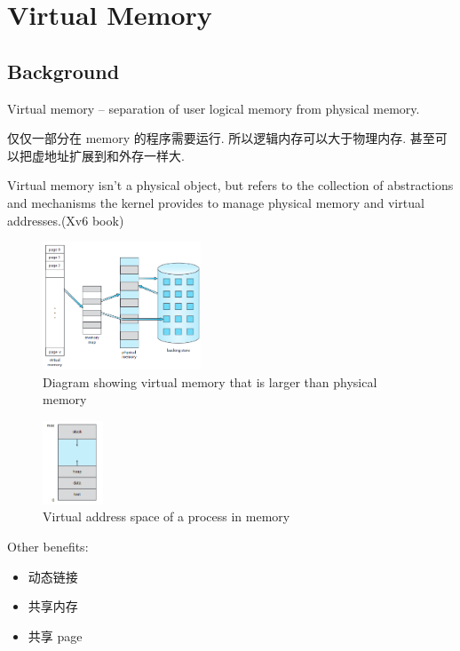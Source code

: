 \newpage
\section{Virtual Memory}

\subsection{Background}
Virtual memory -- separation of user logical memory from physical memory.

仅仅一部分在 memory 的程序需要运行. 所以逻辑内存可以大于物理内存. 甚至可以把虚地址扩展到和外存一样大. 

\begin{definition}
    Virtual memory isn't a physical object, but refers to the collection of abstractions and mechanisms the kernel provides to manage physical memory and virtual addresses.(Xv6 book)
\end{definition}

\begin{figure}[!htb]
    \centering
    \includegraphics[width=0.42\textwidth]{pic/OS9/Diagram showing virtual memory that is larger than physical memory}
    \caption{Diagram showing virtual memory that is larger than physical memory}
\end{figure}

\begin{figure}[!htb]
    \centering
    \includegraphics[width=0.16\textwidth]{pic/OS9/Virtual address space of a process in memory}
    \caption{Virtual address space of a process in memory}
\end{figure}

Other benefits:
\begin{itemize}
    \item 动态链接
    \item 共享内存
    \item 共享 page
\end{itemize}


